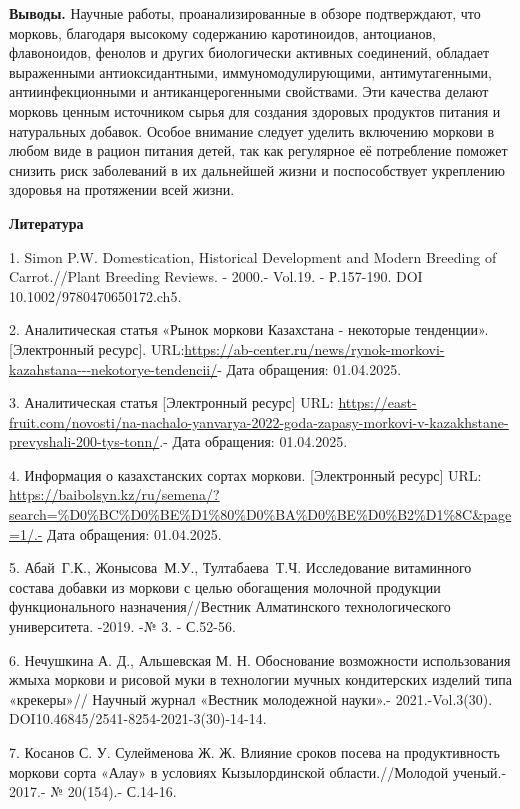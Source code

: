 {\bfseries Выводы.} Научные работы, проанализированные в обзоре
подтверждают, что морковь, благодаря высокому содержанию каротиноидов,
антоцианов, флавоноидов, фенолов и других биологически активных
соединений, обладает выраженными антиоксидантными, иммуномодулирующими,
антимутагенными, антиинфекционными и антиканцерогенными свойствами. Эти
качества делают морковь ценным источником сырья для создания здоровых
продуктов питания и натуральных добавок. Особое внимание следует уделить
включению моркови в любом виде в рацион питания детей, так как
регулярное её потребление поможет снизить риск заболеваний в их
дальнейшей жизни и поспособствует укреплению здоровья на протяжении всей
жизни.

{\bfseries Литература}

1. Simon P.W. Domestication, Historical Development and Modern Breeding
of Carrot.//Plant Breeding Reviews. - 2000.- Vol.19. - Р.157-190. DOI
10.1002/9780470650172.ch5.

2. Аналитическая статья «Рынок моркови Казахстана - некоторые
тенденции». {[}Электронный ресурс{]}.
URL:\href{https://ab-centre.ru/news/rynok-morkovi-kazahstana---nekotorye-tendencii/}{https://ab-center.ru/news/rynok-morkovi-kazahstana-\/-\/-nekotorye-tendencii/}-
Дата обращения: 01.04.2025.

3. Аналитическая статья {[}Электронный ресурс{]} URL:
\url{https://east-fruit.com/novosti/na-nachalo-yanvarya-2022-goda-zapasy-morkovi-v-kazakhstane-prevyshali-200-tys-tonn/}.-
Дата обращения: 01.04.2025.

4. Информация о казахстанских сортах моркови. {[}Электронный ресурс{]}
URL:
\url{https://baibolsyn.kz/ru/semena/?search=\%D0\%BC\%D0\%BE\%D1\%80\%D0\%BA\%D0\%BE\%D0\%B2\%D1\%8C&page=1/.-}
Дата обращения: 01.04.2025.

5. Абай~Г.К., Жонысова~М.У., Тултабаева~Т.Ч. Исследование витаминного
состава добавки из моркови с целью обогащения молочной продукции
функционального назначения//Вестник Алматинского технологического
университета. -2019. -№ 3. - С.52-56.

6. Нечушкина А. Д., Альшевская М. Н. Обоснование возможности
использования жмыха моркови и рисовой муки в технологии мучных
кондитерских изделий типа «крекеры»// Научный журнал «Вестник молодежной
науки».- 2021.-Vol.3(30). DOI10.46845/2541-8254-2021-3(30)-14-14.

7. Косанов С. У. Сулейменова Ж. Ж. Влияние сроков посева на
продуктивность моркови сорта «Алау» в условиях Кызылординской
области.//Молодой ученый.- 2017.- № 20(154).- С.14-16.

